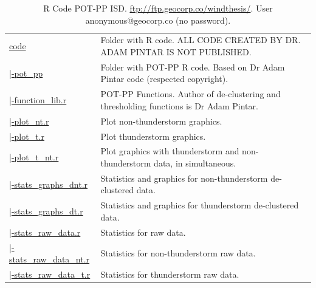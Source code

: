\documentclass[12pt,oneside]{reedthesis}
\begin{document}
\begingroup\fontsize{7}{9}\selectfont
\begin{longtable}[t]{>{\raggedright\arraybackslash}p{1.3in}>{\raggedright\arraybackslash}p{4.9in}}
\caption[R Code POT-PP ISD]{\label{tab:codeisd}R Code POT-PP ISD. \href{ftp://ftp.geocorp.co/windthesis/}{ftp://ftp.geocorp.co/windthesis/}. User anonymous@geocorp.co (no password).}\\
\toprule
\multicolumn{1}{l}{Folder Tree - Ftp Links} & \multicolumn{1}{l}{Description}\\
\midrule
\href{ftp://ftp.geocorp.co/windthesis/code/}{code} & Folder with R code. ALL CODE CREATED BY DR. ADAM PINTAR IS NOT PUBLISHED.\\
\href{ftp://ftp.geocorp.co/windthesis/code/pot_pp/}{\;\;|-pot\_pp} & Folder with POT-PP R code. Based on Dr Adam Pintar code (respected copyright).\\
\href{ftp://ftp.geocorp.co/windthesis/code/pot_pp/function_lib.r}{\;\;\;\;|-function\_lib.r} & POT-PP Functions. Author of de-clustering and thresholding functions is Dr Adam Pintar.\\
\href{ftp://ftp.geocorp.co/windthesis/code/pot_pp/plot_nt.r}{\;\;\;\;|-plot\_nt.r} & Plot non-thunderstorm graphics.\\
\href{ftp://ftp.geocorp.co/windthesis/code/pot_pp/plot_t.r}{\;\;\;\;|-plot\_t.r} & Plot thunderstorm graphics.\\
\href{ftp://ftp.geocorp.co/windthesis/code/pot_pp/plot_t_nt.r}{\;\;\;\;|-plot\_t\_nt.r} & Plot graphics with thunderstorm and non-thunderstorm data, in simultaneous.\\
\href{ftp://ftp.geocorp.co/windthesis/code/pot_pp/statistics_and_graphics_declustered_nt.r}{\;\;\;\;|-stats\_graphs\_dnt.r} & Statistics and graphics for non-thunderstorm de-clustered data.\\
\href{ftp://ftp.geocorp.co/windthesis/code/pot_pp/statistics_and_graphics_declustered_t.r}{\;\;\;\;|-stats\_graphs\_dt.r} & Statistics and graphics for thunderstorm de-clustered data.\\
\href{ftp://ftp.geocorp.co/windthesis/code/pot_pp/statistics_raw_data.r}{\;\;\;\;|-stats\_raw\_data.r} & Statistics for raw data.\\
\href{ftp://ftp.geocorp.co/windthesis/code/pot_pp/statistics_raw_data_nt.r}{\;\;\;\;|-stats\_raw\_data\_nt.r} & Statistics for non-thunderstorm raw data.\\
\href{ftp://ftp.geocorp.co/windthesis/code/pot_pp/statistics_raw_data_t.r}{\;\;\;\;|-stats\_raw\_data\_t.r} & Statistics for thunderstorm raw data.\\

\end{longtable}
\end{document}
